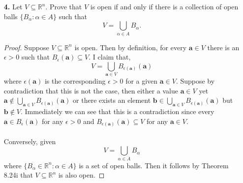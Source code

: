 \documentclass[ 12pt ]{article}
\begin{document}
\begin{enumerate}
	\item[\textbf{4.}] Let $V \subseteq \mathbb{R}^n$. Prove that $V$ is open if and only if there is a collection of open balls $\{ B_\alpha : \alpha \in A \}$ such that $$V =
		\bigcup_{\alpha \in A} B_\alpha.$$

		\begin{proof}
			Suppose $V \subseteq \mathbb{R}^n$ is open. Then by definition, for every $\textbf{a} \in V$ there is an $\epsilon > 0$ such that $B_\epsilon(\textbf{a}) \subseteq V$.
			I claim that, $$V = \bigcup_{\textbf{a} \in V} B_{\epsilon(\textbf{a})} (\textbf{a})$$ where $\epsilon(\textbf{a})$ is the corresponding $\epsilon > 0$ for a given $\textbf{a}
			\in V$. Suppose by contradiction that this is not the case, then either a value $\textbf{a} \in V$ yet $\textbf{a} \notin \bigcup_{\textbf{a} \in V} B_{\epsilon(\textbf{a})}
			(\textbf{a})$ or there exists an element $\textbf{b} \in \bigcup_{\textbf{a} \in V} B_{\epsilon(\textbf{a})} (\textbf{a})$ but $\textbf{b} \notin V$. Immediately we can see
			that this is a contradiction since every $\textbf{a} \in B_{\epsilon}(\textbf{a})$ for any $\epsilon > 0$ and $B_{\epsilon(\textbf{a})}(\textbf{a}) \subseteq V$ for any
			$\textbf{a} \in V$. \\ \\
			Conversely, given $$V = \bigcup_{\alpha \in A} B_\alpha$$ where $\{ B_\alpha \in \mathbb{R}^n: \alpha \in A \}$ is a set of open balls. Then it follows by Theorem 8.24i that
			$V \subseteq \mathbb{R}^n$ is also open.
		\end{proof}

\end{enumerate}
\end{document}
